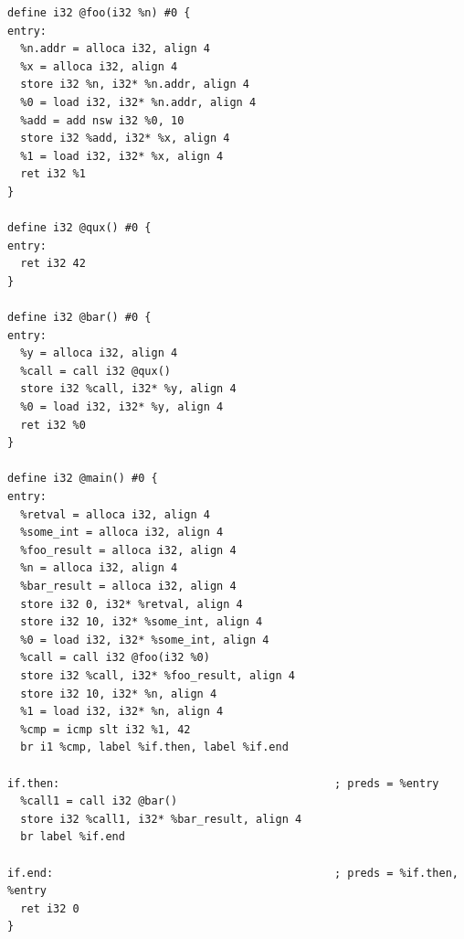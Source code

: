 \documentclass[12pt, twoside]{fithesis2}
\renewcommand{\_}{\leavevmode \kern0.07em\vbox{\hrule width0.4em}}
\begin{document}
\begin{verbatim}
define i32 @foo(i32 %n) #0 {
entry:
  %n.addr = alloca i32, align 4
  %x = alloca i32, align 4
  store i32 %n, i32* %n.addr, align 4
  %0 = load i32, i32* %n.addr, align 4
  %add = add nsw i32 %0, 10
  store i32 %add, i32* %x, align 4
  %1 = load i32, i32* %x, align 4
  ret i32 %1
}

define i32 @qux() #0 {
entry:
  ret i32 42
}

define i32 @bar() #0 {
entry:
  %y = alloca i32, align 4
  %call = call i32 @qux()
  store i32 %call, i32* %y, align 4
  %0 = load i32, i32* %y, align 4
  ret i32 %0
}

define i32 @main() #0 {
entry:
  %retval = alloca i32, align 4
  %some_int = alloca i32, align 4
  %foo_result = alloca i32, align 4
  %n = alloca i32, align 4
  %bar_result = alloca i32, align 4
  store i32 0, i32* %retval, align 4
  store i32 10, i32* %some_int, align 4
  %0 = load i32, i32* %some_int, align 4
  %call = call i32 @foo(i32 %0)
  store i32 %call, i32* %foo_result, align 4
  store i32 10, i32* %n, align 4
  %1 = load i32, i32* %n, align 4
  %cmp = icmp slt i32 %1, 42
  br i1 %cmp, label %if.then, label %if.end

if.then:                                          ; preds = %entry
  %call1 = call i32 @bar()
  store i32 %call1, i32* %bar_result, align 4
  br label %if.end

if.end:                                           ; preds = %if.then, %entry
  ret i32 0
}
\end{verbatim}

\end{document}
